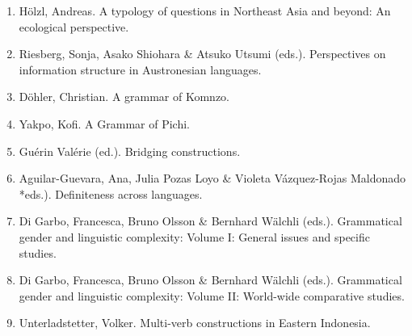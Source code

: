 \begin{multicols}{2}
\begin{enumerate}
\item Hölzl, Andreas. A typology of questions in Northeast Asia and beyond: An ecological perspective.
\item Riesberg, Sonja,  Asako Shiohara \& Atsuko Utsumi (eds.). Perspectives on information structure in Austronesian languages.
\item Döhler, Christian. A grammar of Komnzo.
\item Yakpo, Kofi. A Grammar of Pichi.
\item Guérin Valérie (ed.). Bridging constructions.
\item Aguilar-Guevara, Ana,   Julia Pozas Loyo \&  Violeta Vázquez-Rojas Maldonado *eds.). Definiteness across languages.
\item Di Garbo, Francesca, Bruno Olsson \& Bernhard Wälchli (eds.). Grammatical gender and linguistic complexity: Volume I: General issues and specific studies.
\item Di Garbo, Francesca, Bruno Olsson \& Bernhard Wälchli (eds.). Grammatical gender and linguistic complexity: Volume II: World-wide comparative studies.
\item Unterladstetter, Volker. Multi-verb constructions in Eastern Indonesia.
\end{enumerate}
\end{multicols}
 
  
